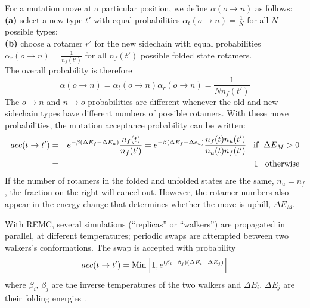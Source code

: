For a mutation move at a particular position, we define $\alpha(o \rightarrow n)$ as follows: \\
{\bf (a)} select a new type $t'$ with equal probabilities $\alpha_t(o \rightarrow n) = \frac{1}{N}$ 
for all $N$ possible types; \\
{\bf (b)} choose a rotamer $r'$ for the new sidechain with equal probabilities $\alpha_r(o \rightarrow n) 
= \frac{1}{n_f(t')}$ for all $n_f(t')$ possible folded state rotamers. \\
The overall probability is therefore
\begin{equation}
\alpha(o \rightarrow n) = \alpha_t(o \rightarrow n) \alpha_r(o \rightarrow n) = \frac{1}{N n_f(t')}
\end{equation}
The $o \rightarrow n$ and $n \rightarrow o$ probabilities are different whenever the old and new sidechain
types have different numbers of possible rotamers. With these move probabilities, the mutation acceptance
probability can be written:
\begin{eqnarray} \label{eq:rule2}
acc(t \rightarrow t') &=& e^{-\beta (\Delta E_f - \Delta E_u)} \frac{ n_f(t) }{ n_f(t') }
 = e^{-\beta (\Delta E_f - \Delta e_u)} \frac{ n_f(t) n_u(t') }{ n_u(t) n_f(t') } 
             {\rm \hspace*{3mm} if \hspace*{2mm} } \Delta E_M > 0 \\
                      &=& 1 {\rm \hspace*{3mm} otherwise}
\end{eqnarray}
If the number of rotamers in the folded and unfolded states are the same, $n_u = n_f$, the fraction on the right
will cancel out. However, the rotamer numbers also appear in the energy change that determines whether the move is
uphill, $\Delta E_M$.

With REMC, several simulations (``replicas'' or ``walkers'') are propagated in parallel, at different temperatures;
periodic swaps are attempted between two walkers's conformations. The swap is accepted with probability
\begin{equation} \label{eq:remc}
acc(t \rightarrow t') = {\rm Min} \left[ 1, e^{(\beta_i - \beta_j)(\Delta E_i - \Delta E_j)} \right]
\end{equation}
where $\beta_i$, $\beta_j$ are the inverse temperatures of the two walkers and $\Delta E_i$, $\Delta E_j$
are their folding energies \cite{Kofke02,Earl05}.

